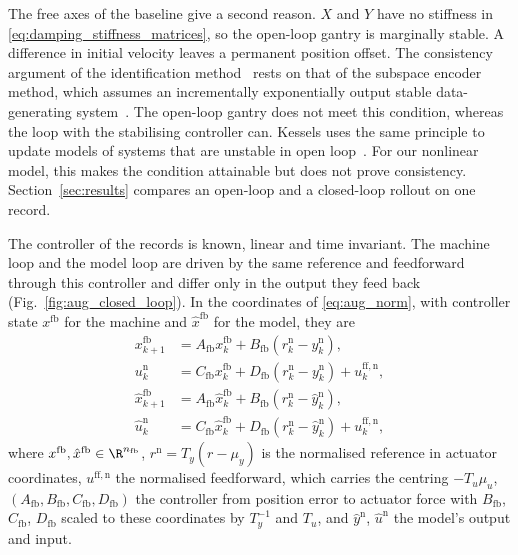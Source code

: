 The free axes of the baseline give a second reason.
$X$ and $Y$ have no stiffness in \eqref{eq:damping_stiffness_matrices}, so the
open-loop gantry is marginally stable.
A difference in initial velocity leaves a permanent position offset.
The consistency argument of the identification
method~\cite[Sec.~5.5]{hoekstra2026lfr} rests on that of the subspace encoder
method, which assumes
an incrementally exponentially output stable data-generating
system~\cite[Cond.~1]{beintema2023subnet}.
The open-loop gantry does not meet this condition, whereas the loop with the
stabilising controller can.
Kessels uses the same principle to update models of systems that are unstable
in open loop~\cite[Ch.~5]{kessels2025ai}.
For our nonlinear model, this makes the condition attainable but does not prove
consistency.
Section~\ref{sec:results} compares an open-loop and a closed-loop rollout on
one record.

The controller of the records is known, linear and time invariant.
The machine loop and the model loop are driven by the same reference and feedforward through this
controller and differ only in the output they feed back
(Fig.~\ref{fig:aug_closed_loop}).
In the coordinates of \eqref{eq:aug_norm}, with controller state
$x^{\mathrm{fb}}$ for the machine and $\hat x^{\mathrm{fb}}$ for the model,
they are
\begin{equation}
\begin{aligned}
 x^{\mathrm{fb}}_{k+1}&=A_{\mathrm{fb}}x^{\mathrm{fb}}_k+B_{\mathrm{fb}}(r^{\mathrm n}_k-y^{\mathrm n}_k),\\
 u^{\mathrm n}_k&=C_{\mathrm{fb}}x^{\mathrm{fb}}_k+D_{\mathrm{fb}}(r^{\mathrm n}_k-y^{\mathrm n}_k)+u^{\mathrm{ff,n}}_k,\\
 \hat x^{\mathrm{fb}}_{k+1}&=A_{\mathrm{fb}}\hat x^{\mathrm{fb}}_k+B_{\mathrm{fb}}(r^{\mathrm n}_k-\hat y^{\mathrm n}_k),\\
 \hat u^{\mathrm n}_k&=C_{\mathrm{fb}}\hat x^{\mathrm{fb}}_k+D_{\mathrm{fb}}(r^{\mathrm n}_k-\hat y^{\mathrm n}_k)+u^{\mathrm{ff,n}}_k,
\end{aligned}
\label{eq:aug_direct_loop}
\end{equation}
where $x^{\mathrm{fb}},\hat x^{\mathrm{fb}}\in\R^{n_{\mathrm{fb}}}$,
$r^{\mathrm n}=T_y(r-\mu_y)$ is the normalised reference in actuator
coordinates, $u^{\mathrm{ff,n}}$ the normalised feedforward, which carries the
centring $-T_u\mu_u$, $(A_{\mathrm{fb}},B_{\mathrm{fb}},C_{\mathrm{fb}},D_{\mathrm{fb}})$
the controller from position error to actuator force with $B_{\mathrm{fb}}$,
$C_{\mathrm{fb}}$, $D_{\mathrm{fb}}$ scaled to these coordinates by $T_y^{-1}$
and $T_u$, and $\hat y^{\mathrm n}$, $\hat u^{\mathrm n}$ the model's output and
input.

